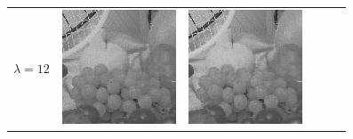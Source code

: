 \documentclass[11pt,a4paper,openright,oneside]{book}
\numberwithin{equation}{section}
\begin{document}
{\begin{figure}[h]
\begin{adjustwidth}{-3cm}{-3cm}
\begin{tabular}{>{\centering\arraybackslash}m{1.5cm} m{2.5cm} m{2.5cm} m{2.5cm} m{2.5cm} m{2.5cm}}
        $\lambda = 12$ &
        \includegraphics[width=\linewidth]{media/tnale/AAAfruits-comp1-ale-12.png} &
        \includegraphics[width=\linewidth]{media/tnale/AAAfruits-comp2-ale-12.png} &

\end{tabular}
\end{adjustwidth}
\end{figure}}
\end{document}
